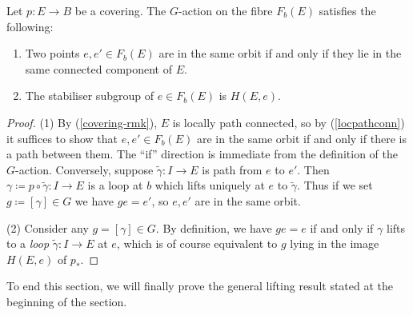 \begin{proposition}
  \label{pi1-action-props}
  Let $p : E \to B$ be a covering. The $G$-action on the fibre
  $F_b(E)$ satisfies the following:
  \begin{enumerate}
  \item \label{orbit} Two points $e,e' \in F_b(E)$ are in the same
    orbit if and only if they lie in the same connected component of
    $E$.
  \item \label{stab} The stabiliser subgroup of $e \in F_b(E)$ is
    $H(E,e)$.
  \end{enumerate}
\end{proposition}

\begin{proof}
  (1) By (\ref{covering-rmk}), $E$ is locally path connected, so by
  (\ref{locpathconn}) it suffices to show that $e,e' \in F_b(E)$ are
  in the same orbit if and only if there is a path between them. The
  ``if'' direction is immediate from the definition of the
  $G$-action. Conversely, suppose $\tilde\gamma : I \to E$ is path
  from $e$ to $e'$. Then $\gamma \coloneqq p \circ \tilde \gamma : I
  \to E$ is a loop at $b$ which lifts uniquely at $e$ to
  $\tilde\gamma$. Thus if we set $g \coloneqq [\gamma] \in G$ we have
  $ge = e'$, so $e,e'$ are in the same orbit.

  (2) Consider any $g = [\gamma] \in G$. By definition, we have $ge =
  e$ if and only if $\gamma$ lifts to a \emph{loop} $\tilde \gamma : I
  \to E$ at $e$, which is of course equivalent to $g$ lying in the
  image $H(E,e)$ of $p_*$.
\end{proof}

To end this section, we will finally prove the general lifting result
stated at the beginning of the section.

